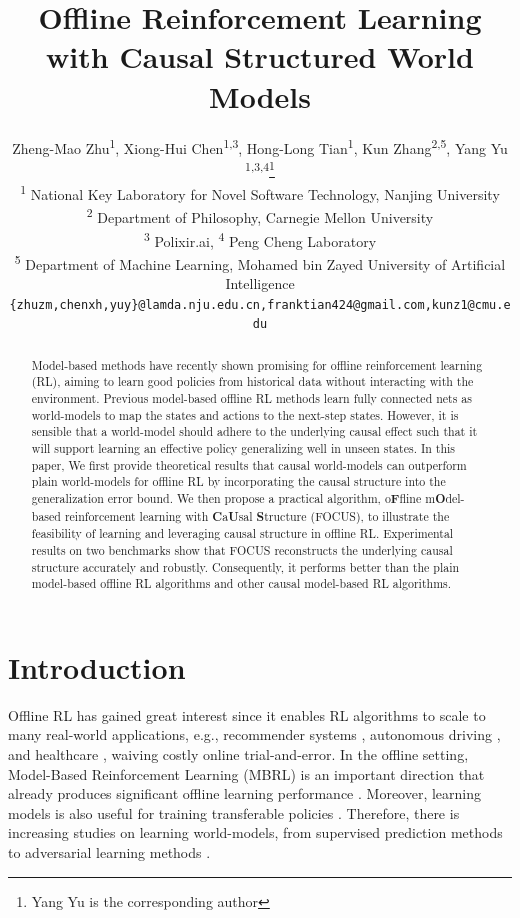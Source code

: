 \documentclass{article}
\title{Offline Reinforcement Learning with Causal Structured World Models}
\date{}
\author{%
  Zheng-Mao Zhu\textsuperscript{\rm 1}, 
    Xiong-Hui Chen\textsuperscript{\rm 1,3}, 
    Hong-Long Tian\textsuperscript{\rm 1}, 
    Kun Zhang\textsuperscript{\rm 2,5}, 
    Yang Yu \textsuperscript{\rm 1,3,4}\thanks{Yang Yu is the corresponding author}\\
  \textsuperscript{\rm 1} National Key Laboratory for Novel Software Technology, Nanjing University\\
  \textsuperscript{\rm 2} Department of Philosophy, Carnegie Mellon University\\
  \textsuperscript{\rm 3} Polixir.ai,   \textsuperscript{\rm 4} Peng Cheng Laboratory\\
  \textsuperscript{\rm 5} Department of Machine Learning, Mohamed bin Zayed University of Artificial Intelligence\\
  \texttt{\{zhuzm,chenxh,yuy\}@lamda.nju.edu.cn,franktian424@gmail.com,kunz1@cmu.edu}   \\
}
\theoremstyle{plain}
\theoremstyle{definition}
\theoremstyle{remark}
\begin{document}
\maketitle
\thispagestyle{plain}


\begin{abstract}
Model-based methods have recently shown promising for offline reinforcement learning (RL), aiming to learn good policies from historical data without interacting with the environment. Previous model-based offline RL methods learn fully connected nets as world-models to map the states and actions to the next-step states. However, it is sensible that a world-model should adhere to the underlying causal effect such that it will support learning an effective policy generalizing well in unseen states. In this paper, We first provide theoretical results that causal world-models can outperform plain world-models for offline RL by incorporating the causal structure into the generalization error bound. We then propose a practical algorithm, o\textbf{F}fline m\textbf{O}del-based reinforcement learning with \textbf{C}a\textbf{U}sal \textbf{S}tructure (FOCUS), to illustrate the feasibility of learning and leveraging causal structure in offline RL. Experimental results on two benchmarks show that FOCUS reconstructs the underlying causal structure accurately and robustly. Consequently, it performs better than the plain model-based offline RL algorithms and other causal model-based RL algorithms.
\end{abstract}

\section{Introduction}

Offline RL has gained great interest since it enables RL algorithms to scale to many real-world applications, e.g., recommender systems \cite{shi.aaai19,shang.mlj21}, autonomous driving \cite{DBLP:journals/corr/abs-1805-04687}, and healthcare \cite{2019Guidelines}, waiving costly online trial-and-error.
In the offline setting, Model-Based Reinforcement Learning (MBRL) is an important direction that already produces significant offline learning performance \cite{mopo,chen.nips21}. Moreover, learning models is also useful for training transferable policies \cite{luo.aaai22,chen.nips21}.
Therefore, there is increasing studies on learning world-models, from supervised prediction methods \cite{DBLP:conf/nips/HaS18} to adversarial learning methods \cite{DBLP:conf/nips/XuLY20}.
\end{document}
